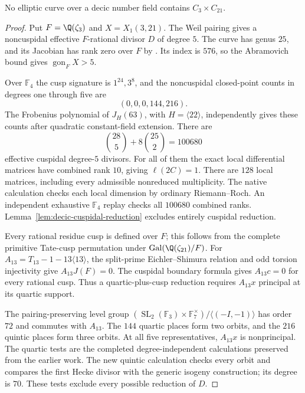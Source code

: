 \begin{proposition}\label{prop:decic321}
No elliptic curve over a decic number field contains
$C_3\times C_{21}$.
\end{proposition}
\begin{proof}
Put $F=\Q(\zeta_3)$ and $X=X_1(3,21)$. The Weil pairing gives a
noncuspidal effective $F$-rational divisor $D$ of degree $5$.
The curve has genus $25$, and its Jacobian has rank zero over $F$
by \cite[Theorem~4.1]{DS}. Its index is $576$, so the Abramovich
bound gives $\operatorname{gon}_F X>5$.

Over $\mathbb F_4$ the cusp signature is $1^{24},3^8$,
and the noncuspidal closed-point counts in degrees one through five
are
\[
 (0,0,0,144,216).
\]
The Frobenius polynomial of $J_H(63)$, with $H=\langle22\rangle$,
independently gives these counts after quadratic constant-field
extension. There are
\[
 \binom{28}{5}+8\binom{25}{2}=100680
\]
effective cuspidal degree-$5$ divisors. For all of them the exact
local differential matrices have combined rank $10$, giving
$\ell(2C)=1$. There are $128$ local matrices, including every
admissible nonreduced multiplicity. The native calculation checks
each local dimension by ordinary Riemann--Roch. An independent
exhaustive $\mathbb F_4$ replay checks all $100680$ combined ranks.
Lemma~\ref{lem:decic-cuspidal-reduction} excludes entirely cuspidal
reduction.

Every rational residue cusp is defined over $F$; this follows
from the complete primitive Tate-cusp permutation under
$\operatorname{Gal}(\Q(\zeta_{21})/F)$.
For $A_{13}=T_{13}-1-13\langle13\rangle$, the split-prime
Eichler--Shimura relation and odd torsion injectivity give
$A_{13}J(F)=0$. The cuspidal boundary formula gives $A_{13}c=0$
for every rational cusp. Thus a quartic-plus-cusp reduction requires
$A_{13}x$ principal at its quartic support.

The pairing-preserving level group
$(\operatorname{SL}_2(\mathbb F_3)\times\mathbb F_7^\times)
/\langle(-I,-1)\rangle$ has order $72$ and commutes with $A_{13}$.
The $144$ quartic places form two orbits, and the $216$ quintic places
form three orbits. At all five representatives, $A_{13}x$ is
nonprincipal. The quartic tests are the completed degree-independent
calculations preserved from the earlier work. The new quintic
calculation checks every orbit and compares the first Hecke divisor
with the generic isogeny construction; its degree is $70$.
These tests exclude every possible reduction of $D$.
\end{proof}


